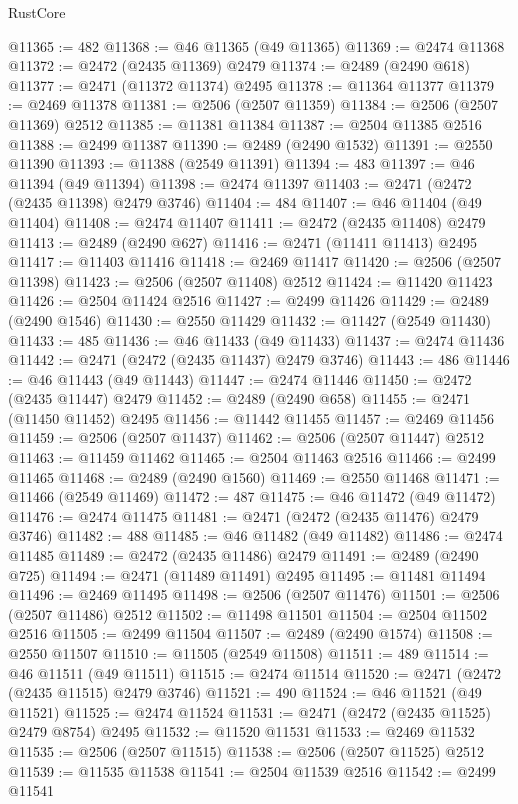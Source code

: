 \begin{lexlean}{RustCore}
\begin{coremodule}
@11365 := 482
@11368 := @46 @11365 (@49 @11365)
@11369 := @2474 @11368
@11372 := @2472 (@2435 @11369) @2479
@11374 := @2489 (@2490 @618)
@11377 := @2471 (@11372 @11374) @2495
@11378 := @11364 @11377
@11379 := @2469 @11378
@11381 := @2506 (@2507 @11359)
@11384 := @2506 (@2507 @11369) @2512
@11385 := @11381 @11384
@11387 := @2504 @11385 @2516
@11388 := @2499 @11387
@11390 := @2489 (@2490 @1532)
@11391 := @2550 @11390
@11393 := @11388 (@2549 @11391)
@11394 := 483
@11397 := @46 @11394 (@49 @11394)
@11398 := @2474 @11397
@11403 := @2471 (@2472 (@2435 @11398) @2479 @3746)
@11404 := 484
@11407 := @46 @11404 (@49 @11404)
@11408 := @2474 @11407
@11411 := @2472 (@2435 @11408) @2479
@11413 := @2489 (@2490 @627)
@11416 := @2471 (@11411 @11413) @2495
@11417 := @11403 @11416
@11418 := @2469 @11417
@11420 := @2506 (@2507 @11398)
@11423 := @2506 (@2507 @11408) @2512
@11424 := @11420 @11423
@11426 := @2504 @11424 @2516
@11427 := @2499 @11426
@11429 := @2489 (@2490 @1546)
@11430 := @2550 @11429
@11432 := @11427 (@2549 @11430)
@11433 := 485
@11436 := @46 @11433 (@49 @11433)
@11437 := @2474 @11436
@11442 := @2471 (@2472 (@2435 @11437) @2479 @3746)
@11443 := 486
@11446 := @46 @11443 (@49 @11443)
@11447 := @2474 @11446
@11450 := @2472 (@2435 @11447) @2479
@11452 := @2489 (@2490 @658)
@11455 := @2471 (@11450 @11452) @2495
@11456 := @11442 @11455
@11457 := @2469 @11456
@11459 := @2506 (@2507 @11437)
@11462 := @2506 (@2507 @11447) @2512
@11463 := @11459 @11462
@11465 := @2504 @11463 @2516
@11466 := @2499 @11465
@11468 := @2489 (@2490 @1560)
@11469 := @2550 @11468
@11471 := @11466 (@2549 @11469)
@11472 := 487
@11475 := @46 @11472 (@49 @11472)
@11476 := @2474 @11475
@11481 := @2471 (@2472 (@2435 @11476) @2479 @3746)
@11482 := 488
@11485 := @46 @11482 (@49 @11482)
@11486 := @2474 @11485
@11489 := @2472 (@2435 @11486) @2479
@11491 := @2489 (@2490 @725)
@11494 := @2471 (@11489 @11491) @2495
@11495 := @11481 @11494
@11496 := @2469 @11495
@11498 := @2506 (@2507 @11476)
@11501 := @2506 (@2507 @11486) @2512
@11502 := @11498 @11501
@11504 := @2504 @11502 @2516
@11505 := @2499 @11504
@11507 := @2489 (@2490 @1574)
@11508 := @2550 @11507
@11510 := @11505 (@2549 @11508)
@11511 := 489
@11514 := @46 @11511 (@49 @11511)
@11515 := @2474 @11514
@11520 := @2471 (@2472 (@2435 @11515) @2479 @3746)
@11521 := 490
@11524 := @46 @11521 (@49 @11521)
@11525 := @2474 @11524
@11531 := @2471 (@2472 (@2435 @11525) @2479 @8754) @2495
@11532 := @11520 @11531
@11533 := @2469 @11532
@11535 := @2506 (@2507 @11515)
@11538 := @2506 (@2507 @11525) @2512
@11539 := @11535 @11538
@11541 := @2504 @11539 @2516
@11542 := @2499 @11541

\end{coremodule}
\end{lexlean}
